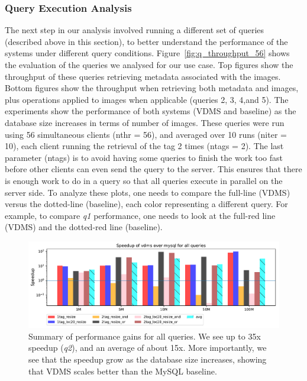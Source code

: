 


\subsubsection{Query Execution Analysis}

The next step in our analysis involved running a different set of queries
(described above in this section),
to better understand the performance of the systems under different query conditions.
Figure~\ref{fig:q_throughput_56} shows the evaluation of the
queries we analysed for our use case.
Top figures show the throughput of these queries
retrieving metadata associated with the images.
Bottom figures show the throughput when retrieving both metadata and images,
plus operations applied to images when applicable (queries 2, 3, 4,and 5).
The experiments show the performance of both systems (VDMS and baseline) as the
database size increases in terms of number of images.
These queries were run using 56 simultaneous clients (nthr = 56),
and averaged over 10 runs (niter = 10),
each client running the retrieval of the tag 2 times (ntags = 2).
The last parameter (ntags) is to avoid having some queries to finish the work
too fast before other clients can even send the query to the server.
This ensures that there is enough work to do in a query so that
all queries execute in parallel on the server side.
To analyze these plots, one needs to compare the full-line (VDMS) versus the
dotted-line (baseline), each color representing a different query.
For example, to compare \textit{q1} performance, one needs to look at
the full-red line (VDMS) and the dotted-red line (baseline).

\begin{figure}[ht!]
\centering
\includegraphics[width=\textwidth]{figures/plot_th_56_query_times_speedup_mysql}
\caption{Summary of performance gains for all queries.
We see up to 35x speedup (\textit{q2}), and an average of about 15x.
More importantly, we see that the speedup grow as the database size increases,
showing that VDMS scales better than the MySQL baseline.}
\label{fig:summary_mysql}
\end{figure}


